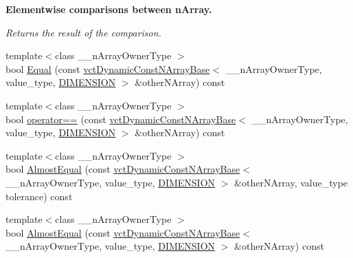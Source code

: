 \begin{Indent}{\bf Elementwise comparisons between n\+Array.}\par
{\em Returns the result of the comparison. }\begin{DoxyCompactItemize}
\item 
{\footnotesize template$<$class \+\_\+\+\_\+n\+Array\+Owner\+Type $>$ }\\bool \hyperlink{classvct_dynamic_const_n_array_base_aa58ee50fa83ed2ffa6e7feb113374b90}{Equal} (const \hyperlink{classvct_dynamic_const_n_array_base}{vct\+Dynamic\+Const\+N\+Array\+Base}$<$ \+\_\+\+\_\+n\+Array\+Owner\+Type, value\+\_\+type, \hyperlink{classvct_dynamic_const_n_array_base_a815ac316ebc1bb2ab1969d307549826faf759c9ab831ff929b89af4ea2865a378}{D\+I\+M\+E\+N\+S\+I\+O\+N} $>$ \&other\+N\+Array) const 
\item 
{\footnotesize template$<$class \+\_\+\+\_\+n\+Array\+Owner\+Type $>$ }\\bool \hyperlink{classvct_dynamic_const_n_array_base_a173df38e1b064aa9c89e1c46e903afbf}{operator==} (const \hyperlink{classvct_dynamic_const_n_array_base}{vct\+Dynamic\+Const\+N\+Array\+Base}$<$ \+\_\+\+\_\+n\+Array\+Owner\+Type, value\+\_\+type, \hyperlink{classvct_dynamic_const_n_array_base_a815ac316ebc1bb2ab1969d307549826faf759c9ab831ff929b89af4ea2865a378}{D\+I\+M\+E\+N\+S\+I\+O\+N} $>$ \&other\+N\+Array) const 
\item 
{\footnotesize template$<$class \+\_\+\+\_\+n\+Array\+Owner\+Type $>$ }\\bool \hyperlink{classvct_dynamic_const_n_array_base_a53bdb4e9abe242d6cbaec4792d353122}{Almost\+Equal} (const \hyperlink{classvct_dynamic_const_n_array_base}{vct\+Dynamic\+Const\+N\+Array\+Base}$<$ \+\_\+\+\_\+n\+Array\+Owner\+Type, value\+\_\+type, \hyperlink{classvct_dynamic_const_n_array_base_a815ac316ebc1bb2ab1969d307549826faf759c9ab831ff929b89af4ea2865a378}{D\+I\+M\+E\+N\+S\+I\+O\+N} $>$ \&other\+N\+Array, value\+\_\+type tolerance) const 
\item 
{\footnotesize template$<$class \+\_\+\+\_\+n\+Array\+Owner\+Type $>$ }\\bool \hyperlink{classvct_dynamic_const_n_array_base_a93edefb84318db443a3aa416b08b12e8}{Almost\+Equal} (const \hyperlink{classvct_dynamic_const_n_array_base}{vct\+Dynamic\+Const\+N\+Array\+Base}$<$ \+\_\+\+\_\+n\+Array\+Owner\+Type, value\+\_\+type, \hyperlink{classvct_dynamic_const_n_array_base_a815ac316ebc1bb2ab1969d307549826faf759c9ab831ff929b89af4ea2865a378}{D\+I\+M\+E\+N\+S\+I\+O\+N} $>$ \&other\+N\+Array) const 
\item 

\end{DoxyCompactItemize}
\end{Indent}
